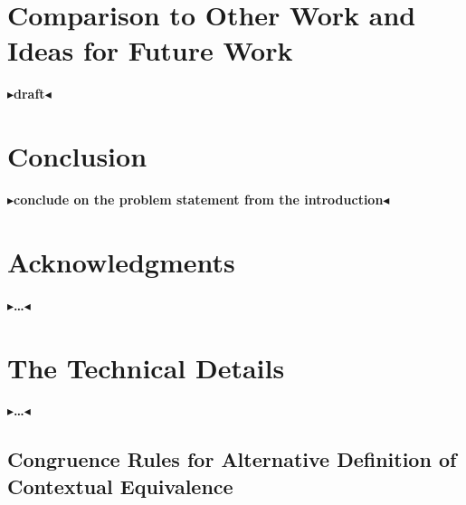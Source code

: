 \documentclass[twoside,11pt,openright]{report}
\theoremstyle{definition}
\newcommand{\todo}[1]{{\color[rgb]{.5,0,0}\textbf{$\blacktriangleright$#1$\blacktriangleleft$}}}
\begin{document}
\chapter{Comparison to Other Work and Ideas for Future Work}
\label{ch:COWFW}

\todo{draft}


\chapter{Conclusion}
\label{ch:conclusion}

\todo{conclude on the problem statement from the introduction}

\chapter*{Acknowledgments}

\todo{\dots}


\cleardoublepage
{}
 



\cleardoublepage
\appendix
\chapter{The Technical Details}

\todo{\dots}

\section{Congruence Rules for Alternative Definition of Contextual Equivalence}\label{appendix:Cng}
\end{document}
